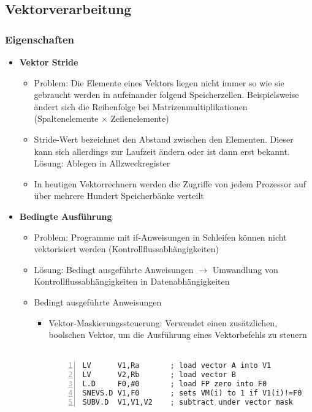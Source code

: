 \subsection{Vektorverarbeitung}

\subsubsection{Eigenschaften}
\begin{itemize}
	\item \textbf{Vektor Stride}
	\begin{itemize}
		\item Problem: Die Elemente eines Vektors liegen nicht immer so wie sie gebraucht werden in aufeinander folgend Speicherzellen. Beispielsweise ändert sich die Reihenfolge bei Matrizenmultiplikationen (Spaltenelemente \(\times\) Zeilenelemente)
		\item Stride-Wert bezeichnet den Abstand zwischen den Elementen. Dieser kann sich allerdings zur Laufzeit ändern oder ist dann erst bekannt. Lösung: Ablegen in Allzweckregister
		\item In heutigen Vektorrechnern werden die Zugriffe von jedem Prozessor auf über mehrere Hundert Speicherbänke verteilt 
	\end{itemize}
	\item \textbf{Bedingte Ausführung}
	\begin{itemize}
		\item Problem: Programme mit if-Anweisungen in Schleifen können nicht vektorisiert werden (Kontrollflussabhängigkeiten)
		\item Lösung: Bedingt ausgeführte Anweisungen \(\rightarrow\) Umwandlung von Kontrollflussabhängigkeiten in Datenabhängigkeiten
		\item Bedingt ausgeführte Anweisungen
		\begin{itemize}
			\item Vektor-Maskierungssteuerung: Verwendet einen zusätzlichen, boolschen Vektor, um die Ausführung eines Vektorbefehls zu steuern\\\\
				\begin{minipage}{\linewidth}
				\begin{lstlisting}[frame=single,numbers=left,mathescape,language={[mips]Assembler},tabsize=4]
LV 		V1,Ra       ; load vector A into V1
LV 		V2,Rb       ; load vector B
L.D 	F0,#0       ; load FP zero into F0
SNEVS.D V1,F0    	; sets VM(i) to 1 if V1(i)!=F0
SUBV.D 	V1,V1,V2  	; subtract under vector mask

\end{lstlisting}
\end{minipage}
\end{itemize}
\end{itemize}
\end{itemize}
